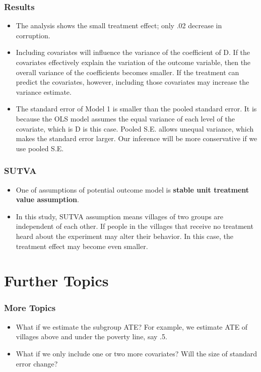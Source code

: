 \documentclass[xcolor=dvipsnames]{beamer}
\begin{document}
\begin{frame}\frametitle{Results}
\begin{itemize}
\item The analysis shows the small treatment effect; only .02 decrease in corruption.
\item Including covariates will influence the variance of the coefficient of D. If the covariates effectively explain the variation of the outcome variable, then the overall variance of the coefficients becomes smaller. If the treatment can predict the covariates, however, including those covariates may increase the variance estimate.
\item The standard error of Model 1 is smaller than the pooled standard error. It is because the OLS model assumes the equal variance of each level of the covariate, which is D is this case. Pooled S.E. allows unequal variance, which makes the standard error larger. Our inference will be more conservative if we use pooled S.E.
\end{itemize}
\end{frame}

\begin{frame}\frametitle{SUTVA}
\begin{itemize}
\item One of assumptions of potential outcome model is \textbf{stable unit treatment value assumption}.
\item In this study, SUTVA assumption means villages of two groups are independent of each other. If people in the villages that receive no treatment heard about the experiment may alter their behavior. In this case, the treatment effect may become even smaller. 
\end{itemize}
\end{frame}

\section{Further Topics}
\begin{frame}\frametitle{More Topics}
\begin{itemize}
\item What if we estimate the subgroup ATE? For example, we estimate ATE of villages above and under the poverty line, say .5.
\item What if we only include one or two more covariates? Will the size of standard error change?
\end{itemize}
\end{frame}



\end{document}
